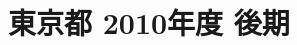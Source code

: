 \documentclass[../../hsm_tok_q.tex]{subfiles}
\begin{document}
    \section{東京都 2010年度 後期}
    \subsection{　}
    
    \newpage
    \subsection{　}
    
    \newpage
    \subsection{　}
    
    \newpage
    \subsection{　}
    
    \newpage
    \subsection{　}
    
\end{document}
